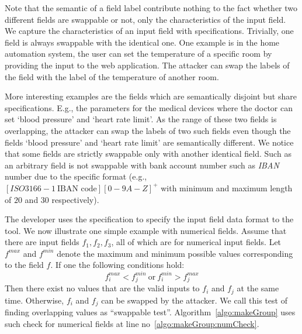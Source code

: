Note that the semantic of a field label contribute nothing to the fact whether two different fields are swappable or not, only the characteristics of the input field. We capture the characteristics of an input field with specifications. Trivially, one field is always swappable with the identical one. One example is in the home automation system, the user can set the temperature of a specific room by providing the input to the web application. The attacker can swap the labels of the field with the label of the temperature of another room. 

More interesting examples are the fields which are semantically disjoint but share specifications. E.g., the parameters for the medical devices where the doctor can set `blood pressure' and `heart rate limit'. As the range of these two fields is overlapping, the attacker can swap the labels of two such fields even though the fields `blood pressure' and `heart rate limit' are semantically different. We notice that some fields are strictly swappable only with another identical field.  Such as an arbitrary field is not swappable with bank account number such as \emph{IBAN} number due to the specific format (e.g., $[ISO 3166-1\ \text{IBAN code}] [0-9A-Z]^+$ with minimum and maximum length of $20$ and $30$ respectively).  



The developer uses the specification to specify the input field data format to the \tool tool. We now illustrate one simple example with numerical fields. Assume that there are input fields $f_1, f_2, f_3$, all of which are for numerical input fields. Let $f^{max}$ and $f^{min}$ denote the maximum and minimum possible values corresponding to the field $f$. If one the following conditions hold:
 $$f_i^{max} < f_j^{min} \ \text{or}\ f_i^{min} > f_j^{max}$$ 
Then there exist no values that are the valid inputs to $f_i$ and $f_j$ at the same time. Otherwise, $f_i$ and $f_j$ can be swapped by the attacker. We call this test of finding overlapping values as ``swappable test''. Algorithm~\ref{algo:makeGroup} uses such check for numerical fields at line no~\ref{algo:makeGroup:numCheck}. 

